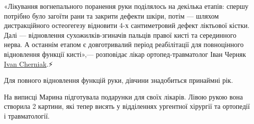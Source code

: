 «Лікування вогнепального поранення руки поділялось на декілька етапів: спершу
потрібно було загоїти рани та закрити дефекти шкіри, потім — шляхом
дистракційного остеогегезу відновити 4-х сантиметровий дефект ліктьової кістки.
Далі — відновлення сухожилків-згиначів пальців правої кисті та серединного
нерва. А останнім етапом є довготривалий період реабілітації для повноцінного
відновлення функції кисті»,— розповідає лікар ортопед-травматолог Іван Черняк
\href{https://www.facebook.com/ivan.s.cherniak}{Ivan Cherniak}.⚡️

Для повного відновлення функцій руки, дівчини знадобиться принаймні рік.

На виписці Марина підготувала подарунки для своїх лікарів. Лівою рукою вона
створила 2 картини, які тепер висять у відділеннях ургентної хірургії та
ортопедії і травматології.💛

